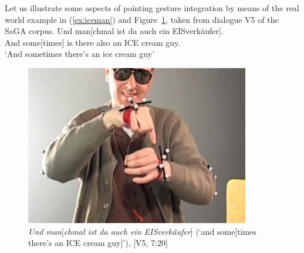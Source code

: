 \documentclass[output=paper]{langsci/langscibook}
\begin{document}
Let us illustrate some aspects of pointing gesture integration by means of the real world example in (\ref{ex:iceman}) and Figure~\ref{fig:iceman}, taken from dialogue V5 of the SaGA corpus. %
%
\ea \label{ex:iceman}
\gll Und man[chmal ist da auch ein {EISverkäufer}]. \\
     And some[times] is there also an {ICE cream guy}. \\
\glt \enquote*{And sometimes there's an ice cream guy}
\z 

\begin{figure}[tb]
  \centering
  \includegraphics[width=0.5\linewidth]{figures/iceman}
  \caption[Ice cream guy]{\textit{Und man}[\textit{chmal ist da auch ein EISverkäufer}] (\enquote*{and some[times there's an ICE cream guy]}), [V5, 7:20]}
  \label{fig:iceman}
\end{figure}
\end{document}
